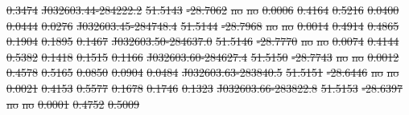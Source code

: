 \documentclass[11pt, a4paper]{book}
\providecommand{\DIFdeltex}[1]{{\protect\color{red}\sout{#1}}}                      %
\providecommand{\DIFdel}[1]{\texorpdfstring{\DIFdeltex{#1}}{}} %
\begin{document}
\DIFdel{0.3474 }%
\DIFdel{J032603.44-284222.2 }%
\DIFdel{51.5143 }%
\DIFdel{-28.7062 }%
\DIFdel{no }%
\DIFdel{no }%
\DIFdel{0.0006 }%
\DIFdel{0.4164 }%
\DIFdel{0.5216 }%
\DIFdel{0.0400 }%
\DIFdel{0.0444 }%
\DIFdel{0.0276 }%
\DIFdel{J032603.45-284748.4 }%
\DIFdel{51.5144 }%
\DIFdel{-28.7968 }%
\DIFdel{no }%
\DIFdel{no }%
\DIFdel{0.0014 }%
\DIFdel{0.4914 }%
\DIFdel{0.4865 }%
\DIFdel{0.1904 }%
\DIFdel{0.1895 }%
\DIFdel{0.1467 }%
\DIFdel{J032603.50-284637.0 }%
\DIFdel{51.5146 }%
\DIFdel{-28.7770 }%
\DIFdel{no }%
\DIFdel{no }%
\DIFdel{0.0074 }%
\DIFdel{0.4144 }%
\DIFdel{0.5382 }%
\DIFdel{0.1418 }%
\DIFdel{0.1515 }%
\DIFdel{0.1166 }%
\DIFdel{J032603.60-284627.4 }%
\DIFdel{51.5150 }%
\DIFdel{-28.7743 }%
\DIFdel{no }%
\DIFdel{no }%
\DIFdel{0.0012 }%
\DIFdel{0.4578 }%
\DIFdel{0.5165 }%
\DIFdel{0.0850 }%
\DIFdel{0.0904 }%
\DIFdel{0.0484 }%
\DIFdel{J032603.63-283840.5 }%
\DIFdel{51.5151 }%
\DIFdel{-28.6446 }%
\DIFdel{no }%
\DIFdel{no }%
\DIFdel{0.0021 }%
\DIFdel{0.4153 }%
\DIFdel{0.5577 }%
\DIFdel{0.1678 }%
\DIFdel{0.1746 }%
\DIFdel{0.1323 }%
\DIFdel{J032603.66-283822.8 }%
\DIFdel{51.5153 }%
\DIFdel{-28.6397 }%
\DIFdel{no }%
\DIFdel{no }%
\DIFdel{0.0001 }%
\DIFdel{0.4752 }%
\DIFdel{0.5009 }%
\end{document}
